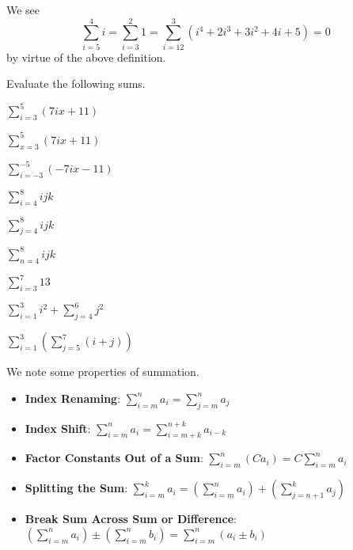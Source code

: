 \begin{example}
    We see
    \[
        \sum_{i=5}^{4}i = \sum_{i=3}^{2}1 = \sum_{i=12}^{3}(i^4 + 2i^3 + 3i^2 + 4i + 5) = 0
    \]
    by virtue of the above definition.
\end{example}

\begin{exercise}
    Evaluate the following sums.
    \begin{multicols}{3}
        \begin{partquestions}{\alph*}
            \item $\displaystyle \sum_{i=3}^{5}(7ix+11)$
            \item $\displaystyle \sum_{x=3}^{5}(7ix+11)$
            \item $\displaystyle \sum_{i=-3}^{-5}(-7ix-11)$
            \item $\displaystyle \sum_{i=4}^{8}ijk$
            \item $\displaystyle \sum_{j=4}^{8}ijk$
            \item $\displaystyle \sum_{n=4}^{8}ijk$
            \item $\displaystyle \sum_{i=3}^{7}13$
            \item $\displaystyle \sum_{i=1}^{3}i^2 + \sum_{j=4}^{6}j^2$
            \item $\displaystyle \sum_{i=1}^{3}\left(\sum_{j=5}^{7}(i+j)\right)$
        \end{partquestions}
    \end{multicols}
\end{exercise}



We note some properties of summation.
\begin{itemize}
    \item \textbf{Index Renaming}: $\displaystyle \sum_{i=m}^na_i = \sum_{j=m}^na_j$
    \item \textbf{Index Shift}: $\displaystyle \sum_{i=m}^na_i = \sum_{i=m+k}^{n+k}a_{i-k}$
    \item \textbf{Factor Constants Out of a Sum}: $\displaystyle \sum_{i=m}^n(Ca_i) = C\sum_{i=m}^na_i$
    \item \textbf{Splitting the Sum}: $\displaystyle \sum_{i=m}^ka_i = \left(\sum_{i=m}^na_i\right) + \left(\sum_{j={n+1}}^ka_j\right)$
    \item \textbf{Break Sum Across Sum or Difference}: $\displaystyle \left(\sum_{i=m}^na_i\right) \pm \left(\sum_{i=m}^nb_i\right) = \sum_{i=m}^n(a_i \pm b_i)$
\end{itemize}

